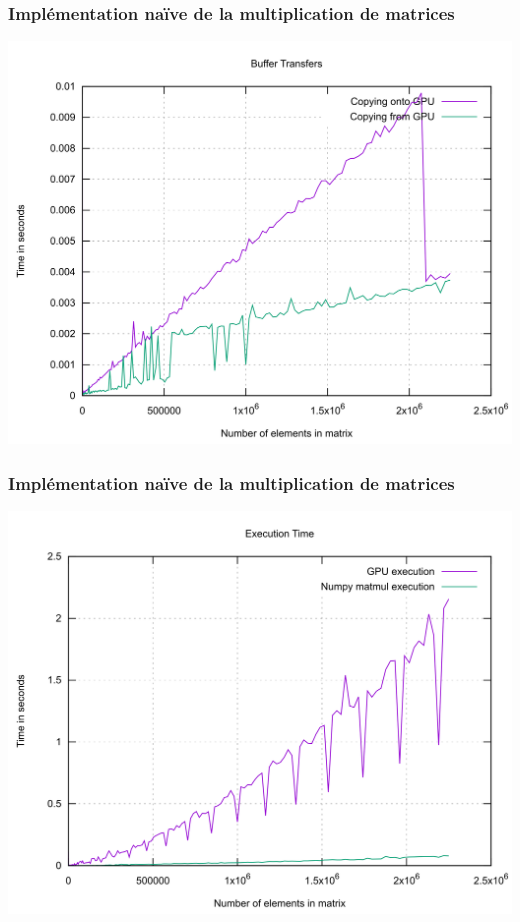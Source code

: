 \begin{frame}
    \frametitle{Implémentation naïve de la multiplication de matrices}
    \includegraphics[width=\textwidth]{../resources/matrix_naive_buffer_transfer.png}
\end{frame}

\begin{frame}
    \frametitle{Implémentation naïve de la multiplication de matrices}
    \includegraphics[width=\textwidth]{../resources/matrix_naive_execution_time.png}
\end{frame}


